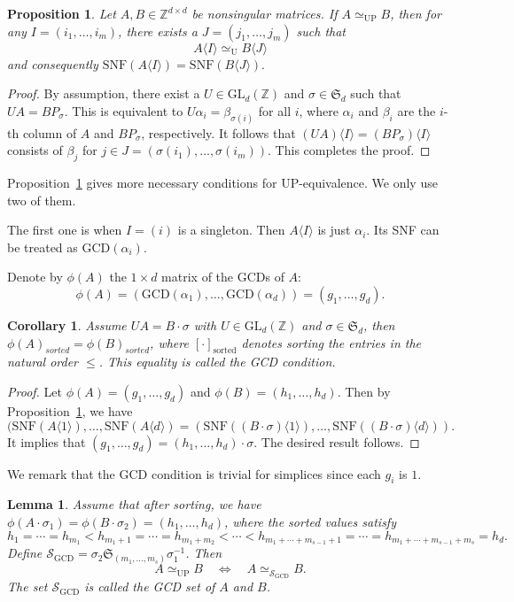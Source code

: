 \documentclass[reqno, 12pt]{article}
\newtheorem{cor}[thm]{Corollary}
\newtheorem{lem}[thm]{Lemma}
\newtheorem{prop}[thm]{Proposition}
\theoremstyle{mydefinition}
\theoremstyle{myremark}
\numberwithin{algorithm}{section}
\def\Z{\mathbb{Z}}
\begin{document}
\begin{prop}\label{prop-faceUE}
    Let  $A,B\in\Z^{d\times d}$ be nonsingular matrices. If $A \simeq_{\mathrm{UP}} B$, then for any $I = (i_1, \dots, i_m)$, there exists a  $J=(j_1, \dots, j_m)$ such that
    $$
    A\langle I\rangle \simeq_{\mathrm{U}} B\langle J\rangle
    $$
and consequently $\mathrm{ SNF}(A\langle I\rangle)=\mathrm{ SNF}(B\langle J\rangle).$
\end{prop}
\begin{proof}
By assumption, there exist a $U\in\mathrm{GL}_d(\Z)$ and $\sigma \in \mathfrak S_d$ such that $UA=BP_\sigma$. This is equivalent to
$U \alpha_i = \beta_{\sigma(i)}$ for all $i$, where $\alpha_i$ and $\beta_i$ are the $i$-th column of $A$ and $BP_\sigma$, respectively.
It follows that $(UA)\langle I\rangle=(BP_\sigma) \langle I\rangle$ consists of $\beta_{j}$ for $j\in J=(\sigma(i_1),\dots,\sigma(i_m))$.
This completes the proof.
\end{proof}


Proposition~\ref{prop-faceUE} gives more necessary conditions for UP-equivalence. We only use two of them.

The first one is when $I= (i)$ is a singleton. Then $A\langle I\rangle$ is just $\alpha_i$.
Its SNF can be treated as $\mathrm{GCD}(\alpha_i)$.

Denote by $\phi(A)$ the $1\times d$ matrix of the GCDs of $A$:
$$ \phi(A) = (\mathrm{GCD}(\alpha_1), \dots, \mathrm{GCD}(\alpha_d))=(g_1,\dots, g_d).$$

\begin{cor}\label{GCD-condition}
Assume $UA=B\cdot\sigma$ with $U\in\mathrm{GL}_d(\Z)$ and $\sigma\in \mathfrak{S}_d$, then  $\phi(A)_{sorted} = \phi(B)_{sorted}$, where $[\cdot]_{\text{sorted}}$ denotes sorting the entries in  the natural order $\leq $. This equality is called the \emph{GCD} condition.
\end{cor}
\begin{proof}
Let $\phi(A)=(g_1,\dots, g_d)$ and $\phi(B)=(h_1,\dots, h_d)$. Then by Proposition~\ref{prop-faceUE},  we have
$$(\mathrm{ SNF}(A\langle 1\rangle),\ldots,\mathrm{ SNF}(A\langle d\rangle) =(\mathrm{ SNF}((B\cdot\sigma)\langle 1\rangle),\ldots,\mathrm{ SNF}((B\cdot\sigma)\langle d\rangle)).$$
It implies that $(g_1,\dots, g_d)=(h_1,\dots, h_d)\cdot \sigma$. The desired result follows.
\end{proof}
We remark that the GCD condition is trivial for simplices since each $g_i$ is $1$.

\begin{lem}
Assume that after sorting, we have $\phi(A \cdot \sigma_1) = \phi(B \cdot \sigma_2) = (h_1, \dots, h_d)$, where the sorted values satisfy
\[
h_{1} = \cdots = h_{m_1}
< h_{m_1+1} = \cdots = h_{m_1+m_2}
< \cdots <
h_{m_1+\cdots+m_{s-1}+1} = \cdots = h_{m_1+\cdots+m_{s-1}+m_s} = h_d.
\]
Define $\mathcal{S}_{\mathrm{GCD}} = \sigma_2 \mathfrak{S}_{(m_1,\dots,m_s)} \sigma_1^{-1}$. Then
\[
A \simeq_{\mathrm{UP}} B \quad \Longleftrightarrow \quad A \simeq_{\mathcal{S}_{\mathrm{GCD}}} B.
\]
The set $\mathcal{S}_{\mathrm{GCD}}$ is called the \emph{GCD set} of $A$ and $B$.
\end{lem}
\end{document}
